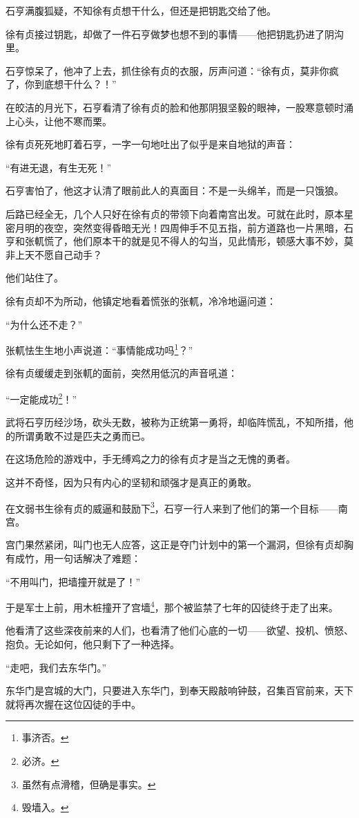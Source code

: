 \begin{multicols}{\theparacolNo}
石亨满腹狐疑，不知徐有贞想干什么，但还是把钥匙交给了他。

徐有贞接过钥匙，却做了一件石亨做梦也想不到的事情——他把钥匙扔进了阴沟里。

石亨惊呆了，他冲了上去，抓住徐有贞的衣服，厉声问道：“徐有贞，莫非你疯了，你到底想干什么？！”

在皎洁的月光下，石亨看清了徐有贞的脸和他那阴狠坚毅的眼神，一股寒意顿时涌上心头，让他不寒而栗。

徐有贞死死地盯着石亨，一字一句地吐出了似乎是来自地狱的声音：

“有进无退，有生无死！”

石亨害怕了，他这才认清了眼前此人的真面目：不是一头绵羊，而是一只饿狼。

后路已经全无，几个人只好在徐有贞的带领下向着南宫出发。可就在此时，原本星密月明的夜空，突然变得昏暗无光！四周伸手不见五指，前方道路也一片黑暗，石亨和张軏慌了，他们原本干的就是见不得人的勾当，见此情形，顿感大事不妙，莫非上天不愿自己动手？

他们站住了。

徐有贞却不为所动，他镇定地看着慌张的张軏，冷冷地逼问道：

“为什么还不走？”

张軏怯生生地小声说道：“事情能成功吗\footnote{事济否。}？”

徐有贞缓缓走到张軏的面前，突然用低沉的声音吼道：

“一定能成功\footnote{必济。}！”

武将石亨历经沙场，砍头无数，被称为正统第一勇将，却临阵慌乱，不知所措，他的所谓勇敢不过是匹夫之勇而已。

在这场危险的游戏中，手无缚鸡之力的徐有贞才是当之无愧的勇者。

这并不奇怪，因为只有内心的坚韧和顽强才是真正的勇敢。

在文弱书生徐有贞的威逼和鼓励下\footnote{虽然有点滑稽，但确是事实。}，石亨一行人来到了他们的第一个目标——南宫。

宫门果然紧闭，叫门也无人应答，这正是夺门计划中的第一个漏洞，但徐有贞却胸有成竹，用一句话解决了难题：

“不用叫门，把墙撞开就是了！”

于是军士上前，用木桩撞开了宫墙\footnote{毁墙入。}，那个被监禁了七年的囚徒终于走了出来。

他看清了这些深夜前来的人们，也看清了他们心底的一切——欲望、投机、愤怒、抱负。无论如何，他只剩下了一种选择。

“走吧，我们去东华门。”

东华门是宫城的大门，只要进入东华门，到奉天殿敲响钟鼓，召集百官前来，天下就将再次握在这位囚徒的手中。


\end{multicols}
